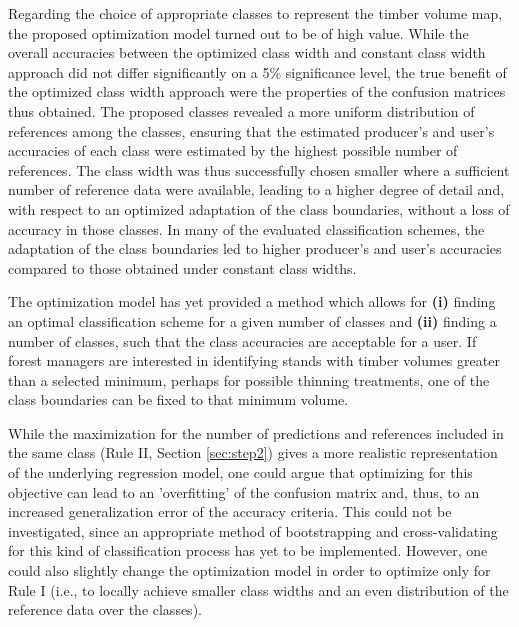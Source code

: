 Regarding the choice of appropriate classes to represent the timber volume map, the proposed optimization model turned out to be of high value. While the overall accuracies between the optimized class width and constant class width approach did not differ significantly on a 5\% significance level, the true benefit of the optimized class width approach were the properties of the confusion matrices thus obtained. The proposed classes revealed a more uniform distribution of references among the classes, ensuring that the estimated producer's and user's accuracies of each class were estimated by the highest possible number of references. The class width was thus successfully chosen smaller where a sufficient number of reference data were available, leading to a higher degree of detail and, with respect to an optimized adaptation of the class boundaries, without a loss of accuracy in those classes. In many of the evaluated classification schemes, the adaptation of the class boundaries led to higher producer's and user's accuracies compared to those obtained under constant class widths.\par
The optimization model has yet provided a method which allows for \textbf{(i)} finding an optimal classification scheme for a given number of classes and \textbf{(ii)} finding a number of classes, such that the class accuracies are acceptable for a user. If forest managers are interested in identifying stands with timber volumes greater than a selected minimum, perhaps for possible thinning treatments, one of the class boundaries can be fixed to that minimum volume.\par
While the maximization for the number of predictions and references included in the same class (Rule II, Section \ref{sec:step2}) gives a more realistic representation of the underlying regression model, one could argue that optimizing for this objective can lead to an 'overfitting' of the confusion matrix and, thus, to an increased generalization error of the accuracy criteria. This could not be investigated, since an appropriate method of bootstrapping and cross-validating for this kind of classification process has yet to be implemented. However, one could also slightly change the optimization model in order to optimize only for Rule I (i.e., to locally achieve smaller class widths and an even distribution of the reference data over the classes).

